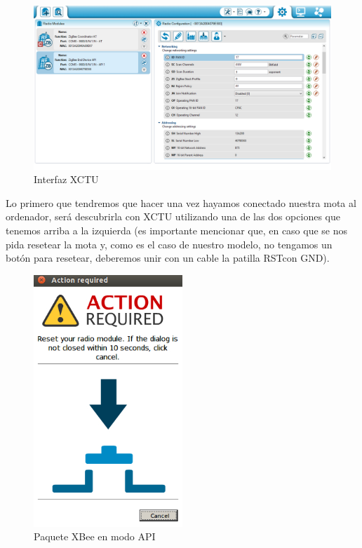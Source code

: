 \begin{figure}[!htb]
\centering
\includegraphics[width=1\textwidth]{./imagenes/interfaz1}
\caption{Interfaz XCTU} \label{fig:interfaz1}
\end{figure}

Lo primero que tendremos que hacer una vez hayamos conectado nuestra mota al ordenador, será descubrirla con XCTU
utilizando una de las dos opciones que tenemos arriba a la izquierda (es importante mencionar que, en caso que se nos
pida resetear la mota y, como es el caso de nuestro modelo, no tengamos un botón para resetear, deberemos unir con un
cable la patilla \guillemotleft RST\guillemotright con \guillemotleft GND\guillemotright).\\

\begin{figure}[!htb]
\centering
\includegraphics[width=0.5\textwidth]{./imagenes/xctureset}
\caption{Paquete XBee en modo API} \label{fig:xctureset}
\end{figure}

